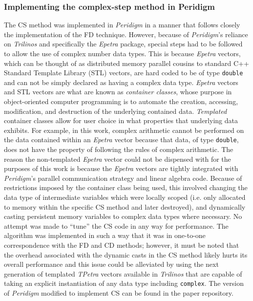 \documentclass[preprint,12pt]{elsarticle}
\begin{document}
\subsubsection{Implementing the complex-step method in Peridigm} 
\label{subsubsec:Impl}
%
The CS method was implemented in \emph{Peridigm} in a manner that follows closely the implementation of the FD technique.  However, because of \emph{Peridigm}'s reliance on \emph{Trilinos} and specifically the \emph{Epetra} package, special steps had to be followed to allow the use of complex number data types.  This is because \emph{Epetra} vectors, which can be thought of as distributed memory parallel cousins to standard C++ Standard Template Library (STL) vectors, are hard coded to be of type {\tt double} and can not be simply declared as having a complex data type.  \emph{Epetra} vectors and STL vectors are what are known as \emph{container classes}, whose purpose in object-oriented computer programming is to automate the creation, accessing, modification,  and destruction of the underlying contained data.  \emph{Templated} container classes allow for user choice in what properties that underlying data exhibits.  For example, in this work, complex arithmetic cannot be performed on the data contained within an \emph{Epetra} vector because that data, of type {\tt double},  does not have the property of following the rules of complex arithmetic. The reason the non-templated \emph{Epetra} vector could not be dispensed with for the purposes of this work is because the \emph{Epetra} vectors are tightly integrated with \emph{Peridigm}'s parallel communication strategy and linear algebra code. Because of restrictions imposed by the container class being used, this involved changing the data type of intermediate variables which were locally scoped (i.e. only allocated to memory within the specific CS method and later destroyed), and dynamically casting persistent memory variables to complex data types where necessary. No attempt was made to ``tune'' the CS code in any way for performance. The algorithm  was implemented in such a way that it was in one-to-one correspondence with the FD and CD methods; however, it must be noted that the overhead associated with the dynamic casts in the CS method likely hurts its overall performance and this issue could be alleviated by using the next generation of templated \emph{TPetra} vectors available in \emph{Trilinos} that are capable of taking an explicit instantiation of any data type including {\tt complex}. The version of \emph{Peridigm} modified to implement CS can be found in the paper repository.  
\end{document}
